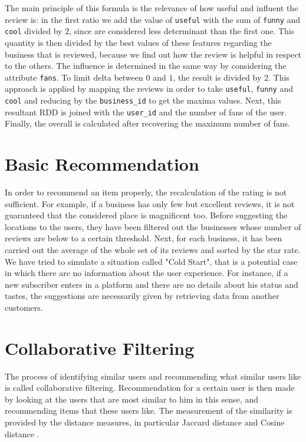 \documentclass{article}
\begin{document}
The main principle of this formula is the relevance of how useful and influent the review is: in the first ratio we add the value of \texttt{useful} with the sum of \texttt{funny} and \texttt{cool} divided by $2$, since are considered less determinant than the first one. This quantity is then divided by the best values of these features regarding the business that is reviewed, because we find out how the review is helpful in respect to the others. The influence is determined in the same way by considering the attribute \texttt{fans}. To limit delta between $0$ and $1$, the result is divided by $2$.
This approach is applied by mapping the reviews in order to take  \texttt{useful}, \texttt{funny} and \texttt{cool} and reducing by the \texttt{business\_id} to get the maxima values. Next, this resultant RDD is joined with the \texttt{user\_id} and the number of fans of the user. Finally, the overall is calculated after recovering the maximum number of fans.

\section{Basic Recommendation}
In order to recommend an item properly, the recalculation of the rating is not sufficient. For example, if a business has only few but excellent reviews, it is not guaranteed that the considered place is magnificent too. Before suggesting the locations to the users, they have been filtered out the businesses whose number of reviews are below to a certain threshold. Next, for each business, it has been carried out the average of the whole set of its reviews and sorted by the star rate. We have tried to simulate a situation called "Cold Start", that is a potential case in which there are no information about the user experience. For instance, if a new subscriber enters in a platform and there are no details about his status and tastes, the suggestions are necessarily given by retrieving data from another customers. 

\section{Collaborative Filtering}
The process of identifying similar users and recommending what similar users like is called collaborative filtering. Recommendation for a certain user is then made by looking at the users that are most similar to him in this sense, and recommending items that these users like. The measurement of the similarity is provided by the distance measures, in particular Jaccard distance and Cosine distance \cite{leskovec2020mining}. 
\end{document}
